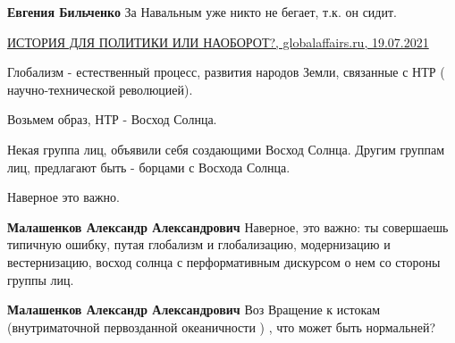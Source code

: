\begin{itemize}
\begin{itemize}
 
\textbf{Евгения Бильченко} За Навальным уже никто не бегает, т.к. он сидит.
\end{itemize}

 
\href{https://globalaffairs.ru/articles/istoriya-dlya-politiki/}{%
ИСТОРИЯ ДЛЯ ПОЛИТИКИ ИЛИ НАОБОРОТ?, globalaffairs.ru, 19.07.2021%
}


Глобализм - естественный процесс, развития народов Земли, связанные с НТР (
научно-технической революцией).

Возьмем образ, НТР - Восход Солнца.

Некая группа лиц, объявили себя создающими Восход Солнца. Другим группам лиц,
предлагают быть - борцами с Восхода Солнца.

Наверное это важно.

\begin{itemize}
 
\textbf{Малашенков Александр Александрович} Наверное, это важно: ты совершаешь типичную ошибку, путая глобализм и глобализацию, модернизацию и вестернизацию, восход солнца с перформативным дискурсом о нем со стороны группы лиц.

 
\textbf{Малашенков Александр Александрович} Воз Вращение к истокам (внутриматочной первозданной океаничности ) , что может быть нормальней?
\end{itemize}


\end{itemize}
